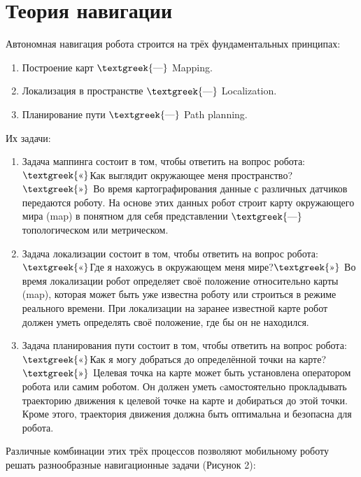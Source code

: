 \documentclass[a4paper]{article}
\begin{document}
\section{Теория навигации}
Автономная навигация робота строится на трёх фундаментальных принципах:

\begin{enumerate}[series=listWWNumiii,label=\arabic*.,ref=\arabic*]
\item Построение карт $\text{\textgreek{—}}$ Mapping.
\item Локализация в пространстве $\text{\textgreek{—}}$ Localization.
\item Планирование пути $\text{\textgreek{—}}$ Path planning.
\end{enumerate}
Их задачи:

\begin{enumerate}[series=listWWNumiv,label=\arabic*.,ref=\arabic*]
\item Задача маппинга состоит в том, чтобы ответить на вопрос робота: $\text{\textgreek{«}}$Как выглядит окружающее меня
пространство?$\text{\textgreek{»}}$ Во время картографирования данные с различных датчиков передаются роботу. На основе
этих данных робот строит карту окружающего мира (map) в понятном для себя представлении $\text{\textgreek{—}}$
топологическом или метрическом.
\item Задача локализации состоит в том, чтобы ответить на вопрос робота: $\text{\textgreek{«}}$Где я нахожусь в
окружающем меня мире?$\text{\textgreek{»}}$ Во время локализации робот определяет своё положение относительно карты
(map), которая может быть уже известна роботу или строиться в режиме реального времени. При локализации на заранее
известной карте робот должен уметь определять своё положение, где бы он не находился.
\item Задача планирования пути состоит в том, чтобы ответить на вопрос робота: $\text{\textgreek{«}}$Как я могу
добраться до определённой точки на карте?$\text{\textgreek{»}}$ Целевая точка на карте может быть установлена
оператором робота или самим роботом. Он должен уметь cамостоятельно прокладывать траекторию движения к целевой точке на
карте и добираться до этой точки. Кроме этого, траектория движения должна быть оптимальна и безопасна для робота.
\end{enumerate}
Различные комбинации этих трёх процессов позволяют мобильному роботу решать разнообразные навигационные задачи (Рисунок
2):
\end{document}
